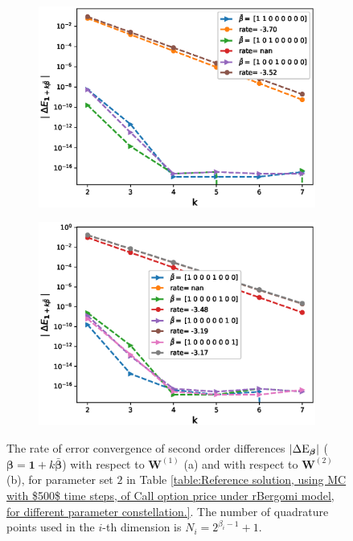 \begin{figure}[h!]
	\centering
	\begin{subfigure}{.4\textwidth}
		\centering
		\includegraphics[width=1\linewidth]{./figures/rBergomi_mixed_error_rates/without_change_measure/N_4/H_002/mixed_difference_order2_rbergomi_4steps_H_002_K_1_totally_hierarch_with_rate_W1}
		\caption{}
		\label{fig:sub3}
	\end{subfigure}%
	\begin{subfigure}{.4\textwidth}
		\centering
		\includegraphics[width=1\linewidth]{./figures/rBergomi_mixed_error_rates/without_change_measure/N_4/H_002/mixed_difference_order2_rbergomi_4steps_H_002_K_1_totally_hierarch_with_rate_W2}
		\caption{}
		\label{fig:sub4}
	\end{subfigure}
	
	\caption{The rate of error convergence of  second order differences $\left\lvert\Delta \text{E}_{\boldsymbol{\beta}}\right\rvert$ ($\boldsymbol{\beta}=\mathbf{1}+k \bar{\boldsymbol{\beta}}$) with respect to $\mathbf{W}^{(1)}$ (a)  and  with respect to $\mathbf{W}^{(2)}$ (b), for parameter set $2$ in Table \ref{table:Reference solution, using MC with $500$ time steps, of Call option price under rBergomi model, for different parameter constellation.}. The number of quadrature points used in the $i$-th dimension is $N_i=2^{\beta_i-1}+1$.}
	\label{fig:second_diff_comp_K_1_H_002}
\end{figure}

